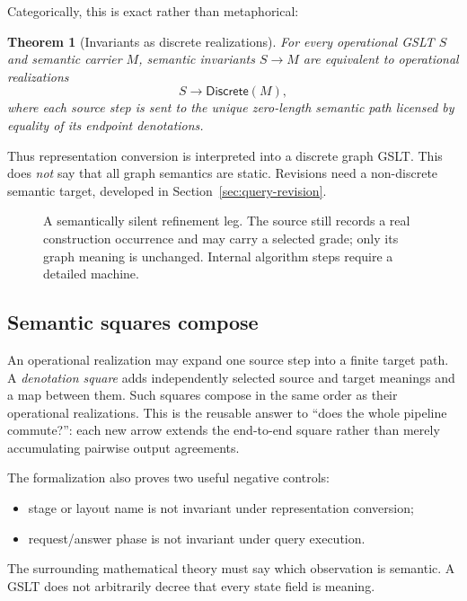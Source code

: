 \documentclass[11pt]{article}
\newtheorem{theorem}{Theorem}
\theoremstyle{remark}
\begin{document}
Categorically, this is exact rather than metaphorical:
\begin{theorem}[Invariants as discrete realizations]
For every operational GSLT \(S\) and semantic carrier \(M\), semantic
invariants \(S\to M\) are equivalent to operational realizations
\[
  S\longrightarrow \mathsf{Discrete}(M),
\]
where each source step is sent to the unique zero-length semantic path licensed
by equality of its endpoint denotations.
\end{theorem}

Thus representation conversion is interpreted into a discrete graph GSLT.
This does \emph{not} say that all graph semantics are static.  Revisions need a
non-discrete semantic target, developed in Section~\ref{sec:query-revision}.

\begin{figure}[htbp]
\centering
{}
\caption{A semantically silent refinement leg.  The source still records a
real construction occurrence and may carry a selected grade; only its graph
meaning is unchanged.  Internal algorithm steps require a detailed machine.}
\label{fig:discrete-realization}
\end{figure}

\subsection{Semantic squares compose}

An operational realization may expand one source step into a finite target
path.  A \emph{denotation square} adds independently selected source and target
meanings and a map between them.  Such squares compose in the same order as
their operational realizations.  This is the reusable answer to
``does the whole pipeline commute?'': each new arrow extends the end-to-end
square rather than merely accumulating pairwise output agreements.

The formalization also proves two useful negative controls:
\begin{itemize}[leftmargin=2em]
  \item stage or layout name is not invariant under representation conversion;
  \item request/answer phase is not invariant under query execution.
\end{itemize}
The surrounding mathematical theory must say which observation is semantic.
A GSLT does not arbitrarily decree that every state field is meaning.
\end{document}
